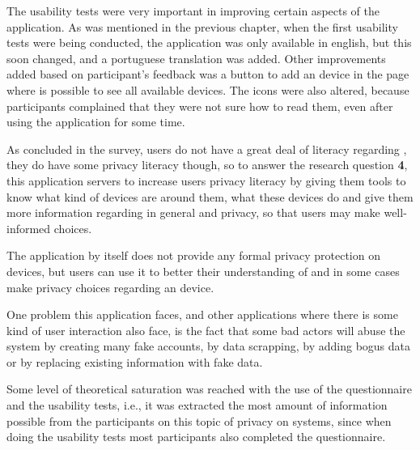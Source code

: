 The usability tests were very important in improving certain aspects of the
application. As was mentioned in the previous chapter, when the first
usability tests were being conducted, the application was only available
in english, but this soon changed, and a portuguese translation was added.
Other improvements added based on participant's feedback was a button
to add an \hyperlink{\acronym}{\acronym} device in the page where is possible to see all available
devices. The icons were also altered, because participants complained that
they were not sure how to read them, even after using the application for some time.

As concluded in the survey, users do not have a great deal of literacy
regarding \hyperlink{\acronym}{\acronym}, they do have some privacy literacy though, so
to answer the research question \textbf{\hyperlink{\acronym}{\acronym}4}, this application servers to increase users
privacy literacy by giving them tools to know what kind of devices
are around them, what these devices do and give them more information
regarding \hyperlink{\acronym}{\acronym} in general and \hyperlink{\acronym}{\acronym} privacy, so that users may make
well-informed choices.

The application by itself does not provide any formal privacy protection
on \hyperlink{\acronym}{\acronym} devices, but users can use it to better their understanding of \hyperlink{\acronym}{\acronym}
and in some cases make privacy choices regarding an \hyperlink{\acronym}{\acronym} device.

One problem this application faces, and other applications where there is
some kind of user interaction also face, is the fact that some bad
actors will abuse the system by creating many fake accounts, by
data scrapping, by adding bogus data or by replacing existing information
with fake data.

Some level of theoretical saturation \cite{low2019pragmatic} was reached with the use of the questionnaire
and the usability tests, i.e., it was extracted the most amount of information
possible from the participants on this topic of privacy on \hyperlink{\acronym}{\acronym} systems, since
when doing the usability tests most participants also completed the questionnaire.

